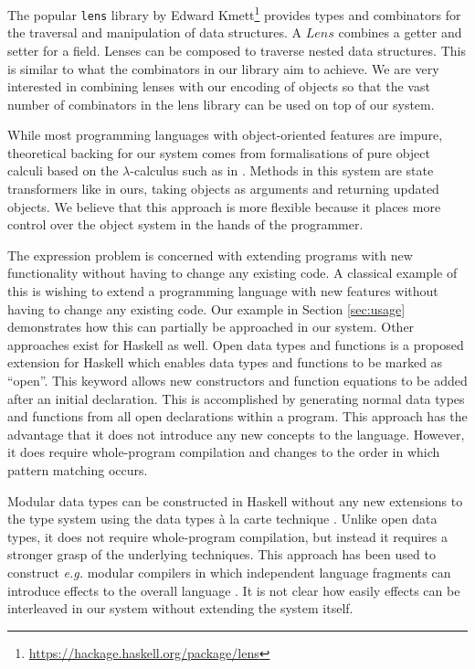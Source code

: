 \documentclass[authoryear,preprint]{sigplanconf}
\begin{document}
The popular \texttt{lens} library by Edward Kmett\footnote{\url{https://hackage.haskell.org/package/lens}} provides types and combinators for the traversal and manipulation of data structures. A $\mathit{Lens}$ combines a getter and setter for a field. Lenses can be composed to traverse nested data structures. This is similar to what the combinators in our library aim to achieve. We are very interested in combining lenses with our encoding of objects so that the vast number of combinators in the lens library can be used on top of our system. 

While most programming languages with object-oriented features are impure, theoretical backing for our system comes from formalisations of pure object calculi based on the $\lambda$-calculus such as in \citet{pierce1994simple}. Methods in this system are state transformers like in ours, taking objects as arguments and returning updated objects. We believe that this approach is more flexible because it places more control over the object system in the hands of the programmer.


The expression problem \cite{wadler1998expression} is concerned with extending programs with new functionality without having to change any existing code. A classical example of this is wishing to extend a programming language with new features without having to change any existing code. Our example in Section \ref{sec:usage} demonstrates how this can partially be approached in our system. Other approaches exist for Haskell as well. Open data types and functions \cite{loh2006open} is a proposed extension for Haskell which enables data types and functions to be marked as ``open''. This keyword allows new constructors and function equations to be added after an initial declaration. This is accomplished by generating normal data types and functions from all open declarations within a program. This approach has the advantage that it does not introduce any new concepts to the language. However, it does require whole-program compilation and changes to the order in which pattern matching occurs.

Modular data types can be constructed in Haskell without any new extensions to the type system using the data types \`a la carte technique \cite{swierstra2008data}. Unlike open data types, it does not require whole-program compilation, but instead it requires a stronger grasp of the underlying techniques. This approach has been used to construct \emph{e.g.} modular compilers in which independent language fragments can introduce effects to the overall language \cite{day2012towards}. It is not clear how easily effects can be interleaved in our system without extending the system itself.
\end{document}

